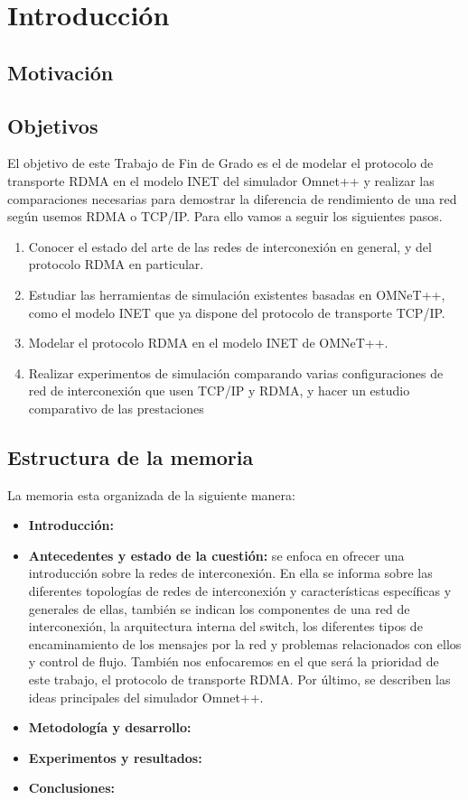 \chapter{Introducción}
\lipsum[1-5]
\section{Motivación}
\lipsum[1-5]
\section{Objetivos}
El objetivo de este Trabajo de Fin de Grado es el de modelar el protocolo de transporte RDMA en el modelo INET del simulador Omnet++ y realizar las comparaciones necesarias para demostrar la diferencia de rendimiento de una red según usemos RDMA o TCP/IP. Para ello vamos a seguir los siguientes pasos.
\begin{enumerate}
	\item Conocer el estado del arte de las redes de interconexión en general, y del protocolo RDMA en particular.
	\item Estudiar las herramientas de simulación existentes basadas en OMNeT++, como el modelo INET que ya dispone del protocolo de transporte TCP/IP.
	\item Modelar el protocolo RDMA en el modelo INET de OMNeT++.
	\item Realizar experimentos de simulación comparando varias configuraciones de red de interconexión que usen TCP/IP y RDMA, y hacer un estudio comparativo de las prestaciones 
\end{enumerate}
\section{Estructura de la memoria}
La memoria esta organizada de la siguiente manera: 

\begin{itemize}
	\item \textbf{Introducción:}
	\item \textbf{Antecedentes y estado de la cuestión:} se enfoca en ofrecer una introducción sobre la redes de interconexión. En ella se informa sobre las diferentes topologías de redes de interconexión y características específicas y generales de ellas, también se indican los componentes de una red de interconexión, la arquitectura interna del switch, los diferentes tipos de encaminamiento de los mensajes por la red y problemas relacionados con ellos y control de flujo. También nos enfocaremos en el que será la prioridad de este trabajo, el protocolo de transporte RDMA. Por último, se describen las ideas principales del simulador Omnet++.
	\item \textbf{Metodología y desarrollo:}
	\item \textbf{Experimentos y resultados:}
	\item \textbf{Conclusiones:}
\end{itemize}